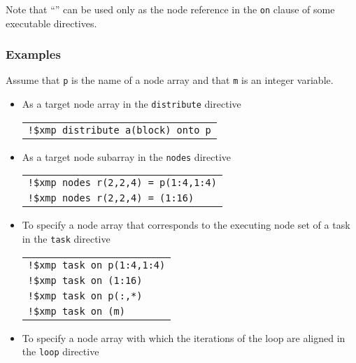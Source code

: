 Note that ``{\tt *}'' can be used only as the node reference in
the {\tt on} clause of some executable directives.


\subsubsection*{Examples}

Assume that {\tt p} is the name of a node array and that {\tt m} is an
integer variable.

\begin{itemize}
\item As a target node array in the {\tt distribute} directive

\begin{tabular}{l}
\verb|!$xmp distribute a(block) onto p| \\
\end{tabular}%

\item As a target node subarray in the {\tt nodes} directive

\begin{tabular}{l}
\verb|!$xmp nodes r(2,2,4) = p(1:4,1:4)| \\
\verb|!$xmp nodes r(2,2,4) = (1:16)| \\
\end{tabular}

\item To specify a node array that corresponds to the executing node set
      of a task in the {\tt task} directive

\begin{tabular}{l}
\verb|!$xmp task on p(1:4,1:4)| \\
\verb|!$xmp task on (1:16)| \\
\verb|!$xmp task on p(:,*)| \\
\verb|!$xmp task on (m)| \\
\end{tabular}

\item To specify a node array with which the iterations of the loop are
      aligned in the {\tt loop} directive


\end{itemize}
